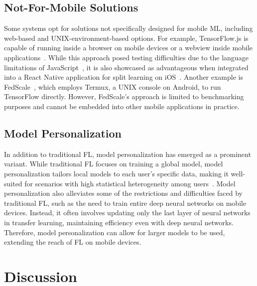 \documentclass[conference]{IEEEtran}
\begin{document}
\subsection{Not-For-Mobile Solutions}

Some systems opt for solutions not specifically designed for
mobile ML,
including web-based and UNIX-environment-based options.
For example,
TensorFlow.js is capable of running inside a browser on mobile devices or
a webview inside mobile applications~\cite{smilkov2019tensorflow}.
While this approach posed testing difficulties due to
the language limitations of JavaScript~\cite{sriraman2022device},
it is also showcased as advantageous when integrated into
a React Native application for split learning on
iOS~\cite{palanisamy2021spliteasy}.
Another example is FedScale~\cite{lai2022fedscale},
which employs Termux, a UNIX console on Android,
to run TensorFlow directly.
However, FedScale's approach is limited to benchmarking purposes and
cannot be embedded into other mobile applications in practice.

\subsection{Model Personalization}

In addition to traditional FL,
model personalization has emerged as a prominent variant.
While traditional FL focuses on training a global model,
model personalization tailors local models to each user's specific data,
making it well-suited for scenarios with
high statistical heterogeneity among users~\cite{kulkarni2020survey}.
Model personalization also alleviates some of
the restrictions and difficulties faced by traditional FL,
such as the need to train entire deep neural networks on mobile devices.
Instead, it often involves updating only the last layer of neural networks in
transfer learning,
maintaining efficiency even with deep neural networks.
Therefore, model personalization can allow for larger models to be used,
extending the reach of FL on mobile devices.


\section{Discussion}

\label{sec:discussion}
\end{document}
